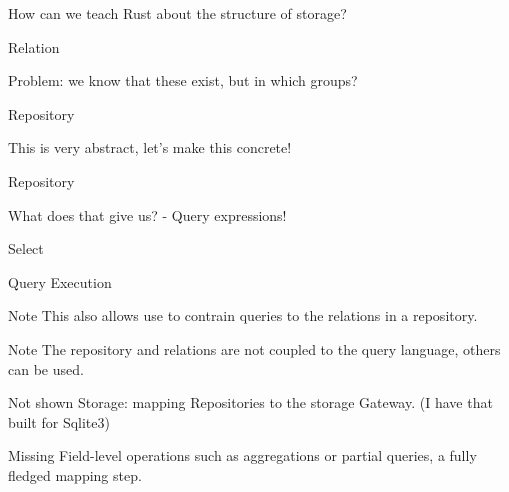 \documentclass{beamer}
\begin{document}
\begin{frame}
  How can we teach Rust about the structure of storage?
\end{frame}

\begin{frame}{Relation}
\end{frame}

\begin{frame}
  Problem: we know that these exist, but in which groups?
\end{frame}

\begin{frame}{Repository}
\end{frame}

\begin{frame}
  This is very abstract, let's make this concrete!
\end{frame}

\begin{frame}{Repository}
\end{frame}

\begin{frame}{}
  What does that give us? - Query expressions!
\end{frame}

\begin{frame}{Select}
\end{frame}

\begin{frame}{Query Execution}
\end{frame}

\begin{frame}{Note}
  This also allows use to contrain queries to the relations in a repository. 
\end{frame}

\begin{frame}{Note}
  The repository and relations are not coupled to the query language, others can be used.
\end{frame}


\begin{frame}{Not shown}
  Storage: mapping Repositories to the storage Gateway. (I have that built for Sqlite3)
\end{frame}

\begin{frame}{Missing}
  Field-level operations such as aggregations or partial queries, a fully fledged mapping step.
\end{frame}
\end{document}
